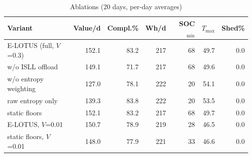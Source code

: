 \begin{table}[t]
\centering
\caption{Ablations (20 days, per-day averages)}\label{tab:abl}
\footnotesize
\setlength{\tabcolsep}{1.6pt}
\begin{tabular}{@{}lrrrrrr@{}}
\toprule
Variant & Value/d & Compl.\% & Wh/d & SOC$_{\min}$ & $T_{\max}$ & Shed\%\\
\midrule
E-LOTUS (full, $V$=0.3) & 152.1 & 83.2 & 217 & 68 & 49.7 & 0.0\\
\quad w/o ISLL offload & 149.1 & 71.7 & 217 & 68 & 49.6 & 0.0\\
\quad w/o entropy weighting & 127.0 & 78.1 & 222 & 20 & 54.1 & 0.0\\
\quad raw entropy only & 139.3 & 83.8 & 222 & 20 & 53.5 & 0.0\\
\quad static floors & 152.1 & 83.2 & 217 & 68 & 49.7 & 0.0\\
E-LOTUS, $V$=0.01 & 150.7 & 78.9 & 219 & 28 & 46.5 & 0.0\\
\quad static floors, $V$=0.01 & 148.0 & 77.9 & 221 & 33 & 46.6 & 0.0\\
\bottomrule
\end{tabular}
\end{table}

